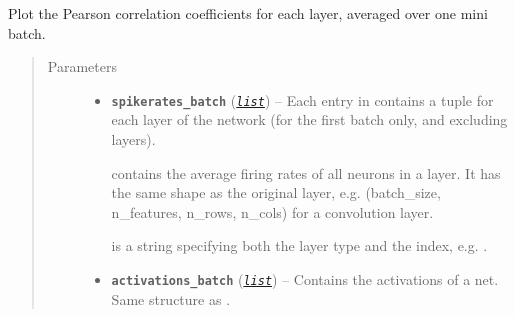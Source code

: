 \documentclass[letterpaper,10pt,english]{sphinxmanual}
\begin{document}
\begin{fulllineitems}
\label{snntoolbox.io_utils:snntoolbox.io_utils.plotting.plot_pearson_coefficients}
Plot the Pearson correlation coefficients for each layer, averaged over one
mini batch.
\begin{quote}\begin{description}
\item[{Parameters}] \leavevmode\begin{itemize}
\item {} 
\textbf{\texttt{spikerates\_batch}} (\href{https://docs.python.org/library/functions.html\#list}{\emph{\texttt{list}}}) -- 
Each entry in  contains a tuple
 for each layer of the network (for the first
batch only, and excluding  layers).

 contains the average firing rates of all neurons in a
layer. It has the same shape as the original layer, e.g.
(batch\_size, n\_features, n\_rows, n\_cols) for a convolution layer.

 is a string specifying both the layer type and the index,
e.g. .


\item {} 
\textbf{\texttt{activations\_batch}} (\href{https://docs.python.org/library/functions.html\#list}{\emph{\texttt{list}}}) -- Contains the activations of a net. Same structure as
.

\end{itemize}

\end{description}\end{quote}

\end{fulllineitems}

\end{document}
